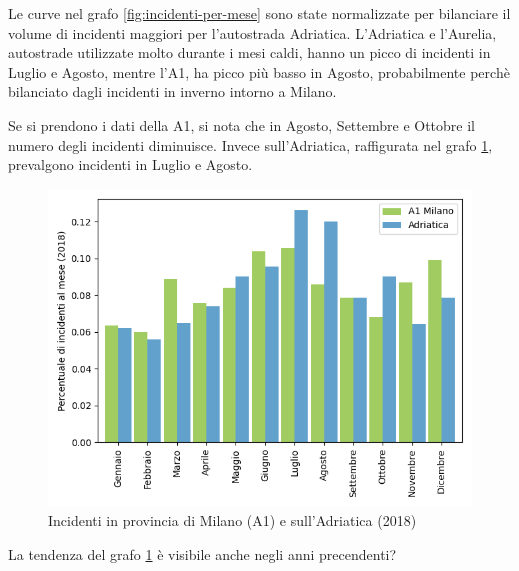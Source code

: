 \documentclass[a4paper]{report}
\begin{document}
Le curve nel grafo \ref{fig:incidenti-per-mese} sono state normalizzate per bilanciare il volume di incidenti maggiori per 
l'autostrada Adriatica.
L'Adriatica e l'Aurelia, autostrade utilizzate molto durante i mesi caldi, hanno un picco di 
incidenti in Luglio e Agosto, mentre l'A1, ha picco più basso in Agosto, probabilmente 
perchè bilanciato dagli incidenti in inverno intorno a Milano.

Se si prendono i dati della A1, si nota che in Agosto, Settembre e Ottobre il numero degli 
incidenti diminuisce.
Invece sull'Adriatica, raffigurata nel grafo \ref{fig:milano-adriatica}, 
prevalgono incidenti in Luglio e Agosto.

\begin{figure}
    \includegraphics[width=\linewidth]{../src/incidenti/incidenti_aci/autostrade/milano_adriatica_2018.png}
    \caption{Incidenti in provincia di Milano (A1) e sull'Adriatica (2018)}
    \label{fig:milano-adriatica}
\end{figure}

La tendenza del grafo \ref{fig:milano-adriatica} è visibile anche negli anni precendenti?
\end{document}
